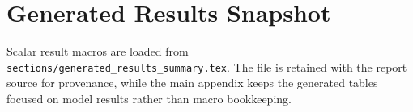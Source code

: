 
\section{Generated Results Snapshot}
\label{app:snapshot}

Scalar result macros are loaded from \texttt{sections/generated\_results\_summary.tex}. The file is retained with the report source for provenance, while the main appendix keeps the generated tables focused on model results rather than macro bookkeeping.
